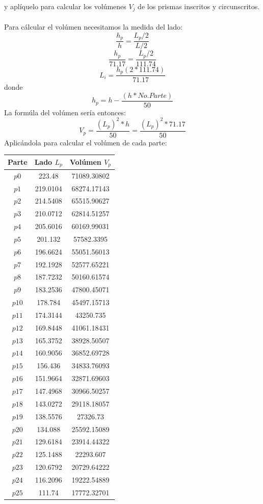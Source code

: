 \documentclass[12pt]{article}
\begin{document}
y aplíquelo para calcular los volúmenes $V_j$ de los prismas inscritos y circunscritos.\\ \\
Para cálcular el volúmen necesitamos la medida del lado:
\[
\frac{h_p}{h} = \frac{L_p/2}{L/2} 
\]
\[
\frac{h_p}{71.17}  =\frac{L_p/2}{111.74}      
\]
\[
L_i = \frac{h_p (2*111.74)}{71.17} 
\]
donde
\[  h_p = h-\frac{(h * No. Parte)}{50}\]
La formúla del volúmen sería entonces:
\[
V_p=\frac{(L_p)^2 * h} {50}  = \frac{(L_p)^2 * 71.17} {50}
\]
\clearpage
Aplicándola para calcular el volúmen de cada parte: 
\begin{multicols}{2}
\begin{tabular}{||c c c||} 
 \hline
 Parte & Lado $L_p$ & Volúmen $V_p$\\ [0.5ex] 
 \hline\hline
$p0$ 	&	223.48	 &	71089.30802 \\
$p1$ 	&	219.0104	 &	68274.17143 \\
$p2$ 	&	214.5408	 &	65515.90627 \\
$p3$ 	&	210.0712	 &	62814.51257 \\
$p4$	 &	205.6016	 &	60169.99031  \\
$p5$ &	201.132	&	57582.3395 \\
$p6$	 &	196.6624 	&	55051.56013 \\
$p7$ &	192.1928	 &	52577.65221 \\
$p8$	 &	187.7232	 &	50160.61574 \\
$p9$	 &	183.2536	 &	47800.45071 \\
$p10$	 &	178.784	&	45497.15713 \\
$p11$	 &	174.3144 	&	43250.735 \\
$p12$	 &	169.8448	 &	41061.18431 \\
$p13$	 &	165.3752	 &	38928.50507 \\
$p14	$ &	160.9056	 &	36852.69728 \\
$p15 $	 &	156.436	&	34833.76093 \\
$p16$ 	 &	151.9664	 &	32871.69603 \\
$p17$	 &	147.4968	 &	30966.50257 \\
$p18$	 &	143.0272	 &	29118.18057 \\
$p19$	 &	138.5576	 &	27326.73 \\
$p20$	 &	134.088	 &	25592.15089 \\
$p21$	 &	129.6184	 &	23914.44322 \\
$p22$	 &	125.1488	 &	22293.607 \\
$p23$	 &	120.6792	 &	20729.64222 \\
$p24$	 &	116.2096	 &	19222.54889 \\
$p25$ 	&	111.74	 &	17772.32701 \\ [1ex] 
\hline
\end{tabular}



\end{multicols}
\end{document}
